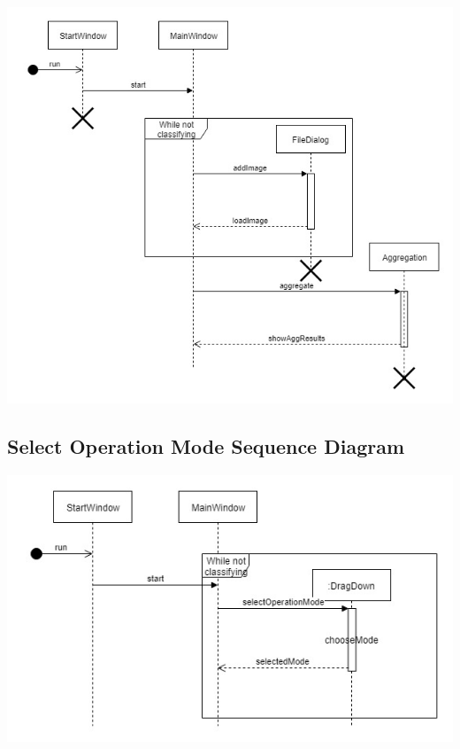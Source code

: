 \documentclass[parskip=full]{scrartcl}
\begin{document}
\begin{center}
\includegraphics[width=1.0\textwidth]{Aggregate.jpg}
\end{center}

\pagebreak

\subsection {Select Operation Mode Sequence Diagram}

\begin{center}
\includegraphics[width=1.0\textwidth]{SelectOperationModeSequenceDiag.jpg}
\end{center}

\pagebreak
\end{document}
